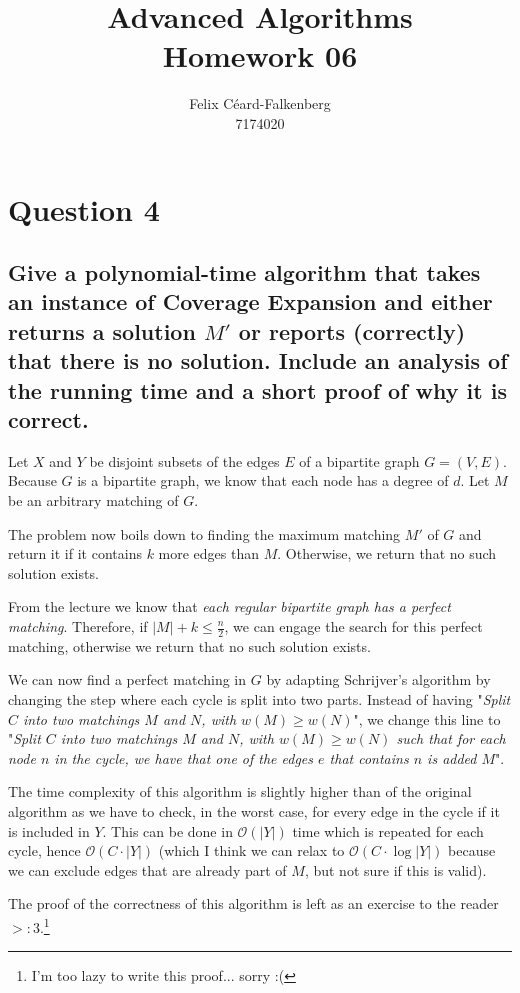 \documentclass{article}
\title{Advanced Algorithms\\Homework 06}
\author{Felix Céard-Falkenberg\\7174020}
\begin{document}
\section{Question 4}
\subsection{\textbf{Give a polynomial-time algorithm that takes an instance of Coverage Expansion and either
returns a solution $M'$ or reports (correctly) that there is no solution. Include an analysis of the
running time and a short proof of why it is correct.}}

Let $X$ and $Y$ be disjoint subsets of the edges $E$ of a bipartite graph $G=(V, E)$.
Because $G$ is a bipartite graph, we know that each node has a degree of $d$.
Let $M$ be an arbitrary matching of $G$.

The problem now boils down to finding the maximum matching $M'$ of $G$ and return it if it contains $k$ more edges than $M$. Otherwise, we return that no such solution exists.

From the lecture we know that \textit{each regular bipartite graph has a perfect matching}. Therefore, if $|M|+k \leq \frac{n}{2}$, we can engage the search for this perfect matching, otherwise we return that no such solution exists.

We can now find a perfect matching in $G$ by adapting Schrijver’s algorithm by changing the step where each cycle is split into two parts. Instead of having "\textit{Split $C$ into two matchings $M$ and $N$, with $w(M) \geq w(N)$}", we change this line to "\textit{Split $C$ into two matchings $M$ and $N$, with $w(M) \geq w(N)$ such that for each node $n$ in the cycle, we have that one of the edges $e$ that contains $n$ is added $M$}". 

The time complexity of this algorithm is slightly higher than of the original algorithm as we have to check, in the worst case, for every edge in the cycle if it is included in $Y$. This can be done in $\mathcal{O}(|Y|)$ time which is repeated for each cycle, hence $\mathcal{O}(C \cdot |Y|)$ (which I think we can relax to $\mathcal{O}(C \cdot \log |Y|)$ because we can exclude edges that are already part of $M$, but not sure if this is valid).

The proof of the correctness of this algorithm is left as an exercise to the reader $>:3$.\!\footnote{I'm too lazy to write this proof... sorry :(}
\end{document}
